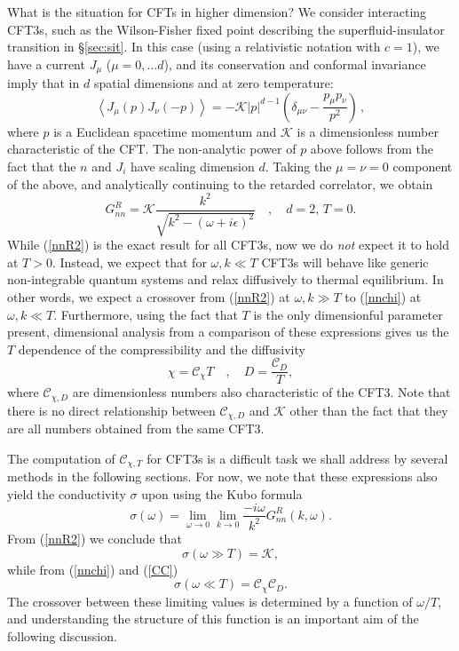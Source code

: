 \documentclass[10pt, oneside]{book}
\def\be{\begin{equation}}
\def\ee{\end{equation}}
\begin{document}
\begin{doublespace}
What is the situation for CFTs in higher dimension? We consider interacting CFT3s, such as the Wilson-Fisher fixed point describing the
superfluid-insulator transition in \S \ref{sec:sit}. In this case (using a relativistic notation with $c=1$), we have a current $J_\mu$ ($\mu = 0, \ldots d$),
and its conservation and conformal invariance imply that in $d$ spatial dimensions and at zero temperature:
\be
\left\langle J_\mu (p) J_\nu ( - p) \right\rangle = - \mathcal{K} |p|^{d-1} \left( \delta_{\mu\nu} - \frac{p_\mu p_\nu}{p^2} \right) \,,\label{Kmn0}
\ee
where $p$ is a Euclidean spacetime momentum and $\mathcal{K}$ is a dimensionless number characteristic of the CFT. 
The non-analytic power of $p$ above follows from the fact that the $n$ and $J_i$ have scaling dimension $d$.
Taking the $\mu=\nu=0$ component of the above, and analytically continuing to the retarded correlator, we obtain
\be
G_{nn}^R = \mathcal{K} \frac{k^2}{\sqrt{k^2 - (\omega + i \epsilon)^2}} \quad, \quad d=2, \, T=0. \label{nnR2}
\ee
While (\ref{nnR2}) is the exact result for all CFT3s, now we do {\it not\/} expect it to hold at $T>0$.
Instead, we expect that for $\omega, k \ll T$ CFT3s will behave like generic non-integrable quantum systems and relax diffusively
to thermal equilibrium. In other words, we expect a crossover from (\ref{nnR2}) at $\omega, k \gg T$ to 
(\ref{nnchi}) at $\omega, k \ll T$. Furthermore, using the fact that $T$ is the only dimensionful parameter present, 
dimensional analysis from a comparison of these expressions gives us the $T$ dependence of the compressibility
and the diffusivity
\be 
\chi = \mathcal{C}_\chi T \quad , \quad D = \frac{\mathcal{C}_D}{T}, \label{CC}
\ee
where $\mathcal{C}_{\chi, D}$ are dimensionless numbers also characteristic of the CFT3. Note that there is no direct relationship
between $\mathcal{C}_{\chi, D}$ and $\mathcal{K}$ other than the fact that they are all numbers obtained from the same CFT3.

The computation of $\mathcal{C}_{\chi, T}$ for CFT3s is a difficult task we shall address by several methods in the following
sections. For now, we note that these expressions also yield the conductivity $\sigma$ upon using the Kubo formula \cite{mahan13}
\be
\sigma ( \omega ) = \lim_{\omega \rightarrow 0} \lim_{k \rightarrow 0} \frac{- i \omega}{k^2} G^R_{nn} (k , \omega). \label{Kubo}
\ee
From (\ref{nnR2}) we conclude that 
\be
\sigma (\omega \gg T ) = \mathcal{K}, \label{sigmaK}
\ee
while from (\ref{nnchi}) and (\ref{CC}) 
\be
\sigma (\omega \ll T ) = \mathcal{C}_\chi \mathcal{C}_D.
\ee
The crossover between these limiting values is determined by a function of $\omega/T$, and understanding the structure of this
function is an important aim of the following discussion.


\end{doublespace}
\end{document}

